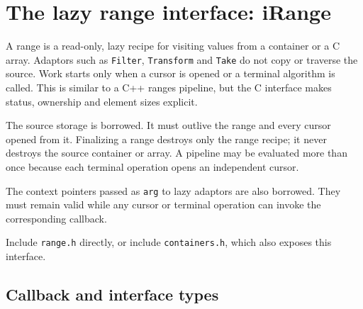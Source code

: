 \section{The lazy range interface: iRange}
\renewcommand{\container}{Range}

A range is a read-only, lazy recipe for visiting values from a container or a
C array.  Adaptors such as \verb|Filter|, \verb|Transform| and \verb|Take|
do not copy or traverse the source.  Work starts only when a cursor is opened
or a terminal algorithm is called.  This is similar to a C++ ranges pipeline,
but the C interface makes status, ownership and element sizes explicit.

The source storage is borrowed.  It must outlive the range and every cursor
opened from it.  Finalizing a range destroys only the range recipe; it never
destroys the source container or array.  A pipeline may be evaluated more than
once because each terminal operation opens an independent cursor.

The context pointers passed as \verb|arg| to lazy adaptors are also borrowed.
They must remain valid while any cursor or terminal operation can invoke the
corresponding callback.

Include \verb|range.h| directly, or include \verb|containers.h|, which also
exposes this interface.

\subsection{Callback and interface types}

